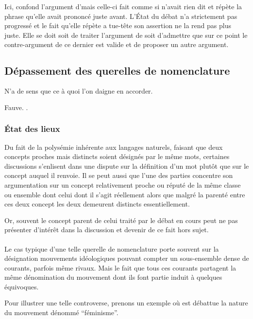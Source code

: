Ici, \B confond l’argument d’\A mais celle-ci fait comme si \B n’avait rien dit et répète la phrase qu’elle avait prononcé juste avant. L’État du débat n’a strictement pas progressé et le fait qu’elle répète a tue-tête son assertion ne la rend pas plus juste. Elle se doit soit de traiter l’argument de \B soit d’admettre que sur ce point le contre-argument de ce dernier est valide et de proposer un autre argument.

\subsection{Dépassement des querelles de nomenclature}
\epigraph{N’a de sens que ce à quoi l’on daigne en accorder.}{Fauve. .}
\subsubsection{État des lieux}
Du fait de la polysémie inhérente aux langages naturels, faisant que deux concepts proches mais distincts soient désignés par le même mots, certaines discussions s’enlisent dans une dispute sur la définition d’un mot plutôt que sur le concept auquel il renvoie. Il se peut aussi que l’une des parties concentre son argumentation sur un concept relativement proche ou réputé de la même classe ou ensemble dont celui dont il s’agit réellement alors que malgré la parenté entre ces deux concept les deux demeurent distincts essentiellement.

Or, souvent le concept parent de celui traité par le débat en cours peut ne pas présenter d’intérêt dans la discussion et devenir de ce fait hors sujet.

\paragraph{}
Le cas typique d’une telle querelle de nomenclature porte souvent sur la désignation mouvements idéologiques pouvant compter un sous-ensemble dense de courants, parfois même rivaux. Mais le fait que tous ces courants partagent la même dénomination du mouvement dont ils font partie induit à quelques équivoques.

Pour illustrer une telle controverse, prenons un exemple où est débattue la nature du mouvement dénommé \enquote{féminisme}.



